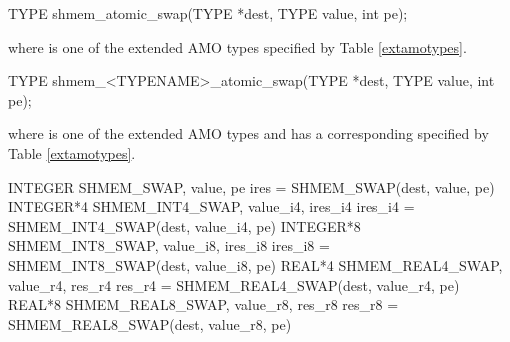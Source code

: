 
\begin{apidefinition}

\begin{C11synopsis}
TYPE shmem_atomic_swap(TYPE *dest, TYPE value, int pe);
\end{C11synopsis}
where \TYPE{} is one of the extended \ac{AMO} types specified by Table \ref{extamotypes}.

\begin{Csynopsis}
TYPE shmem_<TYPENAME>_atomic_swap(TYPE *dest, TYPE value, int pe);
\end{Csynopsis}
where \TYPE{} is one of the extended \ac{AMO} types and has a corresponding \TYPENAME{} specified by Table \ref{extamotypes}.

\begin{DeprecateBlock}
\begin{Fsynopsis}
INTEGER SHMEM_SWAP, value, pe
ires = SHMEM_SWAP(dest, value, pe)
INTEGER*4 SHMEM_INT4_SWAP, value_i4, ires_i4
ires_i4 = SHMEM_INT4_SWAP(dest, value_i4, pe)
INTEGER*8 SHMEM_INT8_SWAP, value_i8, ires_i8
ires_i8 = SHMEM_INT8_SWAP(dest, value_i8, pe)
REAL*4 SHMEM_REAL4_SWAP, value_r4, res_r4
res_r4 = SHMEM_REAL4_SWAP(dest, value_r4, pe)
REAL*8 SHMEM_REAL8_SWAP, value_r8, res_r8
res_r8 = SHMEM_REAL8_SWAP(dest, value_r8, pe)
\end{Fsynopsis}
\end{DeprecateBlock}

\begin{apiarguments}
\end{apiarguments}




\end{apidefinition}
